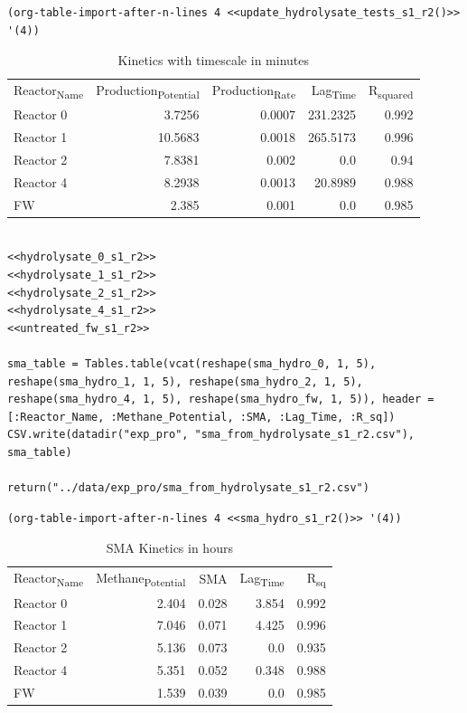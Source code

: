 \documentclass[11pt]{article}
\begin{document}
\begin{verbatim}
(org-table-import-after-n-lines 4 <<update_hydrolysate_tests_s1_r2()>> '(4))
\end{verbatim}

\begin{table}[htbp]
\caption{Kinetics with timescale in minutes}
\centering
\begin{tabular}{lrrrr}
Reactor\textsubscript{Name} & Production\textsubscript{Potential} & Production\textsubscript{Rate} & Lag\textsubscript{Time} & R\textsubscript{squared}\\[0pt]
Reactor 0 & 3.7256 & 0.0007 & 231.2325 & 0.992\\[0pt]
Reactor 1 & 10.5683 & 0.0018 & 265.5173 & 0.996\\[0pt]
Reactor 2 & 7.8381 & 0.002 & 0.0 & 0.94\\[0pt]
Reactor 4 & 8.2938 & 0.0013 & 20.8989 & 0.988\\[0pt]
FW & 2.385 & 0.001 & 0.0 & 0.985\\[0pt]
\end{tabular}
\end{table}

\begin{verbatim}

<<hydrolysate_0_s1_r2>>
<<hydrolysate_1_s1_r2>>
<<hydrolysate_2_s1_r2>>
<<hydrolysate_4_s1_r2>>
<<untreated_fw_s1_r2>>

sma_table = Tables.table(vcat(reshape(sma_hydro_0, 1, 5), reshape(sma_hydro_1, 1, 5), reshape(sma_hydro_2, 1, 5), reshape(sma_hydro_4, 1, 5), reshape(sma_hydro_fw, 1, 5)), header = [:Reactor_Name, :Methane_Potential, :SMA, :Lag_Time, :R_sq])
CSV.write(datadir("exp_pro", "sma_from_hydrolysate_s1_r2.csv"), sma_table)

return("../data/exp_pro/sma_from_hydrolysate_s1_r2.csv")
\end{verbatim}

\begin{verbatim}
(org-table-import-after-n-lines 4 <<sma_hydro_s1_r2()>> '(4))
\end{verbatim}

\begin{table}[htbp]
\caption{SMA Kinetics in hours}
\centering
\begin{tabular}{lrrrr}
Reactor\textsubscript{Name} & Methane\textsubscript{Potential} & SMA & Lag\textsubscript{Time} & R\textsubscript{sq}\\[0pt]
Reactor 0 & 2.404 & 0.028 & 3.854 & 0.992\\[0pt]
Reactor 1 & 7.046 & 0.071 & 4.425 & 0.996\\[0pt]
Reactor 2 & 5.136 & 0.073 & 0.0 & 0.935\\[0pt]
Reactor 4 & 5.351 & 0.052 & 0.348 & 0.988\\[0pt]
FW & 1.539 & 0.039 & 0.0 & 0.985\\[0pt]
\end{tabular}
\end{table}
\end{document}
